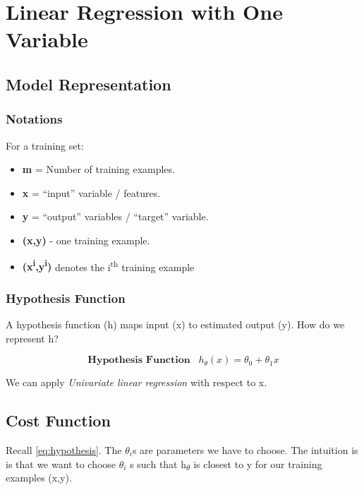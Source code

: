 \section{Linear Regression with One Variable}
    \subsection{Model Representation}
        \subsubsection{Notations}
            For a training set:
           \begin{itemize}
               \item \textbf{m} = Number of training examples.
               \item \textbf{x} = ``input'' variable / features.
               \item \textbf{y} = ``output'' variables / ``target'' variable.
               \item \textbf{(x,y)} - one training example.
               \item \textbf{(x\textsuperscript{i},y\textsuperscript{i})} denotes the i\textsuperscript{th} training example 

           \end{itemize}

        \subsubsection{Hypothesis Function}
        
           A hypothesis function (h) maps input (x) to estimated output (y).
           How do we represent h?

           \begin{equation} 
               \boxed{ 
                   \textbf{Hypothesis Function}\hspace{10pt}  h_\theta (x) = \theta_0 + \theta_1x
           }
              \label{eq:hypothesis}
           \end{equation}

           We can apply \emph{Univariate linear regression} with respect to x. 
    \subsection{Cost Function}

    Recall \ref{eq:hypothesis}. The $\theta_i$s are parameters we have to choose. The intuition is is that we want to choose $\theta_i$ s such that h\textsubscript{$\theta$} is closest to y for our training examples (x,y).
    

